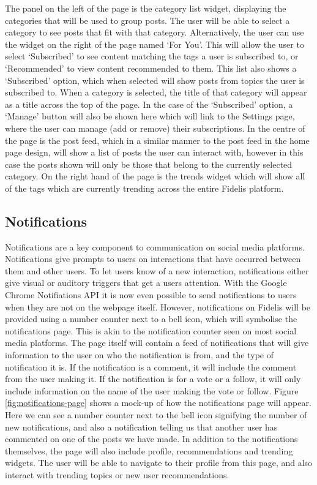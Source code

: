 The panel on the left of the page is the category list widget, displaying the categories that will be used to group posts. The user will be able to select a category to see posts that fit with that category. Alternatively, the user can use the widget on the right of the page named `For You'. This will allow the user to select `Subscribed' to see content matching the tags a user is subscribed to, or `Recommended' to view content recommended to them. This list also shows a `Subscribed' option, which when selected will show posts from topics the user is subscribed to. When a category is selected, the title of that category will appear as a title across the top of the page. In the case of the `Subscribed' option, a `Manage' button will also be shown here which will link to the Settings page, where the user can manage (add or remove) their subscriptions. In the centre of the page is the post feed, which in a similar manner to the post feed in the home page design, will show a list of posts the user can interact with, however in this case the posts shown will only be those that belong to the currently selected category. On the right hand of the page is the trends widget which will show all of the tags which are currently trending across the entire Fidelis platform.

\subsection{Notifications}
Notifications are a key component to communication on social media platforms. Notifications give prompts to users on interactions that have occurred between them and other users. To let users know of a new interaction, notifications either give visual or auditory triggers that get a users attention. With the Google Chrome Notifiations API \cite{ChromeAPI:Notifications} it is now even possible to send notifications to users when they are not on the webpage itself. However, notifications on Fidelis will be provided using a number counter next to a bell icon, which will symbolise the notifications page. This is akin to the notification counter seen on most social media platforms. The page itself will contain a feed of notifications that will give information to the user on who the notification is from, and the type of notification it is. If the notification is a comment, it will include the comment from the user making it. If the notification is for a vote or a follow, it will only include information on the name of the user making the vote or follow. Figure \ref{fig:notifications-page} shows a mock-up of how the notifications page will appear. Here we can see a number counter next to the bell icon signifying the number of new notifications, and also a notification telling us that another user has commented on one of the posts we have made. In addition to the notifications themselves, the page will also include profile, recommendations and trending widgets. The user will be able to navigate to their profile from this page, and also interact with trending topics or new user recommendations.

